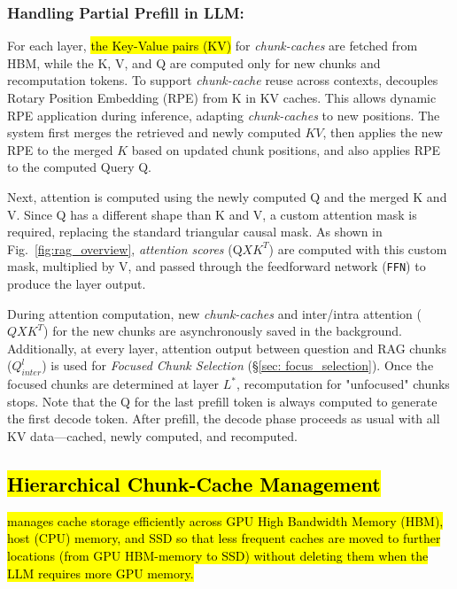 \subsubsection{Handling Partial Prefill in  LLM:}
\label{sec: inference_runner}



For each layer, \hl{the Key-Value pairs (KV)} for \textit{chunk-caches} are fetched from HBM, while the K, V, and Q are computed only for new chunks and recomputation tokens.
To support \textit{chunk-cache} reuse across contexts, \sys decouples Rotary Position Embedding (RPE) from K in KV caches. This allows dynamic RPE application during inference, adapting \textit{chunk-caches} to new positions. The system first merges the retrieved and newly computed $KV$, then applies the new RPE to the merged $K$ based on updated chunk positions, and also applies RPE to the computed Query Q. 


Next, attention is computed using the newly computed Q and the merged K and V. Since Q has a different shape than K and V, a custom attention mask is required, replacing the standard triangular causal mask. As shown in Fig.~\ref{fig:rag_overview}, \textit{attention scores} (Q$XK^T$) are computed with this custom mask, multiplied by V, and passed through the feedforward network (\texttt{FFN}) to produce the layer output.


During attention computation, new \textit{chunk-caches} and inter/intra attention ($QXK^T$) for the new chunks are asynchronously saved in the background. Additionally, at every layer, attention output between question and RAG chunks ($Q_{inter}^l$) is used for \textit{Focused Chunk Selection} (\S\ref{sec: focus_selection}). Once the focused chunks are determined at layer $L^*$, recomputation for "unfocused" chunks stops.
Note that the Q for the last prefill token is always computed to generate the first decode token. After prefill, the decode phase proceeds as usual with all KV data—cached, newly computed, and recomputed. 


\subsection{\hl{Hierarchical {Chunk-Cache} Management}} 
\label{sec: storage,swap,loading}

\hl{
\sys manages cache storage efficiently across GPU High Bandwidth Memory (HBM), host (CPU) memory, and SSD so that less frequent caches are moved to
further locations (from GPU HBM-memory to SSD) without deleting them when the LLM requires more GPU memory.
}


